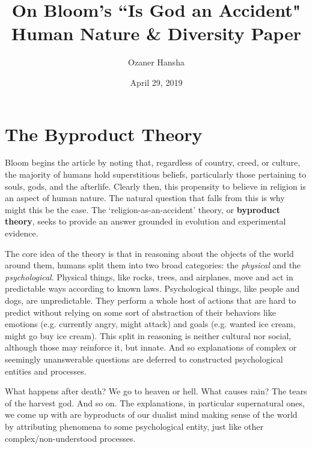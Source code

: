 \documentclass{article}
\begin{document}
\title{%
  On Bloom's ``Is God an Accident" \\
  \large Human Nature \& Diversity Paper}
\author{Ozaner Hansha}
\date{April 29, 2019}
\maketitle


\section{The Byproduct Theory}
Bloom begins the article by noting that, regardless of country, creed, or culture, the majority of humans hold superstitious beliefs, particularly those pertaining to souls, gods, and the afterlife. Clearly then, this propensity to believe in religion is an aspect of human nature. The natural question that falls from this is why might this be the case. The `religion-as-an-accident' theory, or \textbf{byproduct theory}, seeks to provide an answer grounded in evolution and experimental evidence.

The core idea of the theory is that in reasoning about the objects of the world around them, humans split them into two broad categories: the \emph{physical} and the \emph{psychological}. Physical things, like rocks, trees, and airplanes, move and act in predictable ways according to known laws. Psychological things, like people and dogs, are unpredictable. They perform a whole host of actions that are hard to predict without relying on some sort of abstraction of their behaviors like emotions (e.g. currently angry, might attack) and goals (e.g. wanted ice cream, might go buy ice cream). This split in reasoning is neither cultural nor social, although those may reinforce it, but innate. And so explanations of complex or seemingly unanswerable questions are deferred to constructed psychological entities and processes.

What happens after death? We go to heaven or hell. What causes rain? The tears of the harvest god. And so on. The explanations, in particular supernatural ones, we come up with are byproducts of our dualist mind making sense of the world by attributing phenomena to some psychological entity, just like other complex/non-understood processes.
\end{document}
